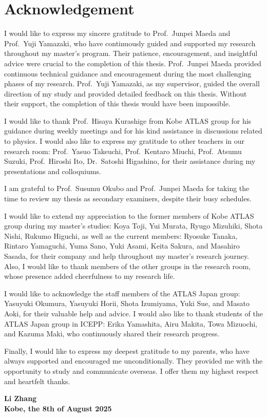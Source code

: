 \chapter*{Acknowledgement}
\markboth{}{} %
I would like to express my sincere gratitude to Prof.~Junpei Maeda and Prof.~Yuji Yamazaki, who have continuously guided and supported my research throughout my master’s program. Their patience, encouragement, and insightful advice were crucial to the completion of this thesis. Prof.~Junpei Maeda provided continuous technical guidance and encouragement during the most challenging phases of my research. Prof.~Yuji Yamazaki, as my supervisor, guided the overall direction of my study and provided detailed feedback on this thesis. Without their support, the completion of this thesis would have been impossible.

I would like to thank Prof.~Hisaya Kurashige from Kobe ATLAS group for his guidance during weekly meetings and for his kind assistance in discussions related to physics. I would also like to express my gratitude to other teachers in our research room: Prof.~Yasuo Takeuchi, Prof.~Kentaro Miuchi, Prof.~Atsumu Suzuki, Prof.~Hiroshi Ito, Dr.~Satoshi Higashino, for their assistance during my presentations and colloquiums.

I am grateful to Prof.~Susumu Okubo and Prof.~Junpei Maeda for taking the time to review my thesis as secondary examiners, despite their busy schedules.

I would like to extend my appreciation to the former members of Kobe ATLAS group during my master’s studies: Koya Toji, Yui Murata, Ryugo Mizuhiki, Shota Nishi, Rukumo Higuchi, as well as the current members: Ryosuke Tanaka, Rintaro Yamaguchi, Yuma Sano, Yuki Asami, Keita Sakura, and Masahiro Sasada, for their company and help throughout my master’s research journey. Also, I would like to thank members of the other groups in the research room, whose presence added cheerfulness to my research life.

I would like to acknowledge the staff members of the ATLAS Japan group: Yasuyuki Okumura, Yasuyuki Horii, Shota Izumiyama, Yuki Sue, and Masato Aoki, for their valuable help and advice. I would also like to thank students of the ATLAS Japan group in ICEPP: Erika Yamashita, Airu Makita, Towa Mizuochi, and Kazuma Maki, who continuously shared their research progress.

Finally, I would like to express my deepest gratitude to my parents, who have always supported and encouraged me unconditionally. They provided me with the opportunity to study and communicate overseas. I offer them my highest respect and heartfelt thanks.

\par\bigskip
\par\bigskip

\begin{flushright}
\par\bigskip
\textbf{Li Zhang}\\
\textbf{Kobe, the 8th of August 2025}
\end{flushright}

